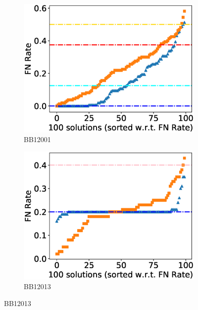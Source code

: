 \begin{figure}[!htbp]
	\centering
	\begin{adjustwidth}{-1cm}{-1cm}
		\begin{subfigure}{0.22\textwidth}
			\includegraphics[width=\columnwidth]{Figure/summary/precomputedInit/Balibase/BB12001_fnrate_density_single_run}
			\caption{BB12001}
		\end{subfigure}	
		\begin{subfigure}{0.22\textwidth}
			\includegraphics[width=\columnwidth]{Figure/summary/precomputedInit/Balibase/BB12013_fnrate_density_single_run}
			\caption{BB12013}
		\end{subfigure}

\end{adjustwidth}
\end{figure}
